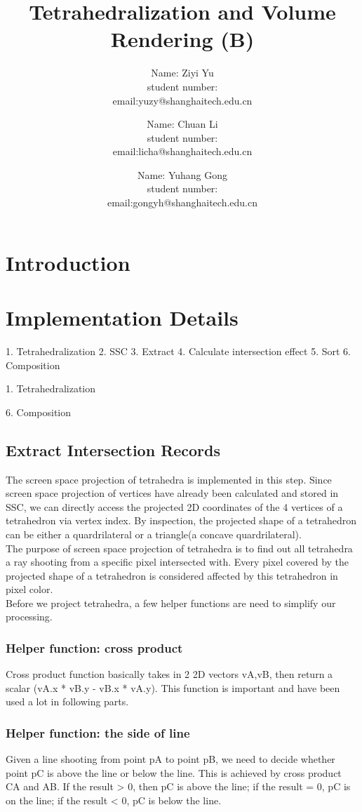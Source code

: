 \documentclass[acmtog]{acmart}
\title{Tetrahedralization and Volume Rendering (B)}
\author{Name: Ziyi Yu   \\ student number:\quad 2018533124
	\\email:\quad yuzy@shanghaitech.edu.cn}
\author{Name: Chuan Li   \\ student number:\quad 123456789
	\\email:\quad licha@shanghaitech.edu.cn}
\author{Name: Yuhang Gong  \\ student number:\quad 2018533180
	\\email:\quad gongyh@shanghaitech.edu.cn}
\begin{document}
\maketitle

\vspace*{2 ex}


\section{Introduction}


\section{Implementation Details}
1. Tetrahedralization
2. SSC
3. Extract
4. Calculate intersection effect
5. Sort
6. Composition

1. Tetrahedralization



6. Composition
\subsection{Extract Intersection Records}
The screen space projection of tetrahedra is implemented in this step. Since screen space projection of vertices have already been calculated and stored in SSC, we can directly access the projected 2D coordinates of the 4 vertices of a tetrahedron via vertex index. By inspection, the projected shape of a tetrahedron can be either a quardrilateral or a triangle(a concave quardrilateral).
\\The purpose of screen space projection of tetrahedra is to find out all tetrahedra a ray shooting from a specific pixel intersected with. Every pixel covered by the projected shape of a tetrahedron is considered affected by this tetrahedron in pixel color.
\\Before we project tetrahedra, a few helper functions are need to simplify our processing.
\\
\subsubsection{Helper function: cross product}
Cross product function basically takes in 2 2D vectors vA,vB, then return a scalar (vA.x * vB.y - vB.x * vA.y). This function is important and have been used a lot in following parts. 
\\
\subsubsection{Helper function: the side of line}
Given a line shooting from point pA to point pB, we need to decide whether point pC is above the line or below the line. This is achieved by cross product CA and AB. If the result > 0, then pC is above the line; if the result = 0, pC is on the line; if the result < 0, pC is below the line.
\\
\end{document}
